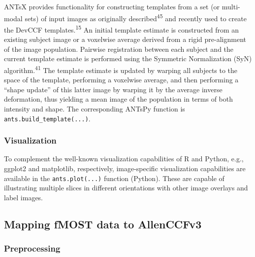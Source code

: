 \documentclass[
  12pt,
]{article}
\begin{document}
ANTsX provides functionality for constructing templates from a set (or
multi-modal sets) of input images as originally
described\textsuperscript{45} and recently used to create the DevCCF
templates.\textsuperscript{15} An initial template estimate is
constructed from an existing subject image or a voxelwise average
derived from a rigid pre-alignment of the image population. Pairwise
registration between each subject and the current template estimate is
performed using the Symmetric Normalization (SyN)
algorithm.\textsuperscript{41} The template estimate is updated by
warping all subjects to the space of the template, performing a
voxelwise average, and then performing a ``shape update'' of this latter
image by warping it by the average inverse deformation, thus yielding a
mean image of the population in terms of both intensity and shape. The
corresponding ANTsPy function is \texttt{ants.build\_template(...)}.

\hypertarget{visualization}{%
\subsubsection{Visualization}\label{visualization}}

To complement the well-known visualization capabilities of R and Python,
e.g., ggplot2 and matplotlib, respectively, image-specific visualization
capabilities are available in the \texttt{ants.plot(...)} function
(Python). These are capable of illustrating multiple slices in different
orientations with other image overlays and label images.

\hypertarget{mapping-fmost-data-to-allenccfv3}{%
\subsection{Mapping fMOST data to
AllenCCFv3}\label{mapping-fmost-data-to-allenccfv3}}

\hypertarget{preprocessing}{%
\subsubsection{Preprocessing}\label{preprocessing}}
\end{document}
